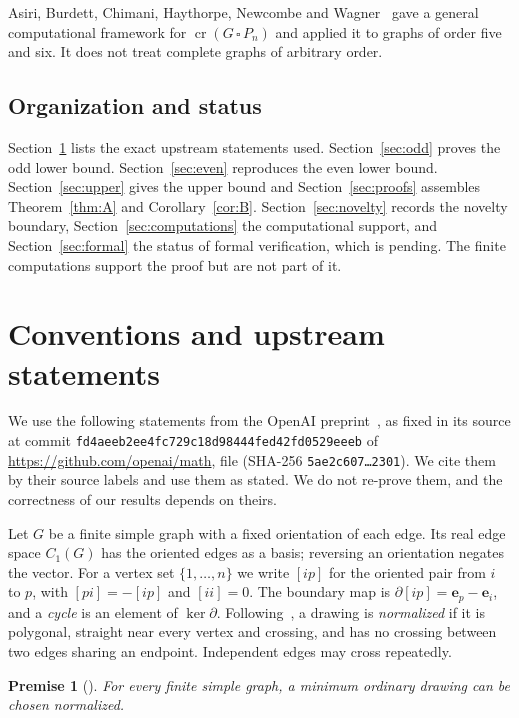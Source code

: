 \documentclass[11pt,a4paper]{article}
\newtheorem{premise}{Premise}
\theoremstyle{definition}
\theoremstyle{remark}
\numberwithin{equation}{section}
\newcommand{\crn}{\operatorname{cr}}
\newcommand{\ee}{\mathbf e}
\begin{document}
Asiri, Burdett, Chimani, Haythorpe, Newcombe and Wagner~\cite{Asiri} gave a general computational framework for $\crn(G\,\square\,P_n)$ and applied it to graphs of order five and six. It does not treat complete graphs of arbitrary order.

\subsection{Organization and status}
Section~\ref{sec:premises} lists the exact upstream statements used. Section~\ref{sec:odd} proves the odd lower bound. Section~\ref{sec:even} reproduces the even lower bound. Section~\ref{sec:upper} gives the upper bound and Section~\ref{sec:proofs} assembles Theorem~\ref{thm:A} and Corollary~\ref{cor:B}. Section~\ref{sec:novelty} records the novelty boundary, Section~\ref{sec:computations} the computational support, and Section~\ref{sec:formal} the status of formal verification, which is pending. The finite computations support the proof but are not part of it.

\section{Conventions and upstream statements}\label{sec:premises}

We use the following statements from the OpenAI preprint~\cite{OAIKn}, as fixed in its source at commit \texttt{fd4aeeb2ee4fc729c18d98444fed42fd0529eeeb} of \url{https://github.com/openai/math}, file  (SHA-256 \texttt{5ae2c607\ldots2301}). We cite them by their source labels and use them as stated. We do not re-prove them, and the correctness of our results depends on theirs.

Let $G$ be a finite simple graph with a fixed orientation of each edge. Its real edge space $C_1(G)$ has the oriented edges as a basis; reversing an orientation negates the vector. For a vertex set $\{1,\dots,n\}$ we write $[ip]$ for the oriented pair from $i$ to $p$, with $[pi]=-[ip]$ and $[ii]=0$. The boundary map is $\partial[ip]=\ee_p-\ee_i$, and a \emph{cycle} is an element of $\ker\partial$. Following~\cite[Section~2]{OAIKn}, a drawing is \emph{normalized} if it is polygonal, straight near every vertex and crossing, and has no crossing between two edges sharing an endpoint. Independent edges may cross repeatedly.

\begin{premise}[{\cite[Lemma~A.1, label \texttt{lem:normalization}]{OAIKn}}]\label{U:norm}
For every finite simple graph, a minimum ordinary drawing can be chosen normalized.
\end{premise}
\end{document}
